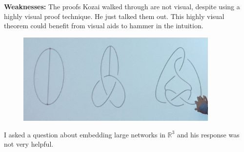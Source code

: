 \documentclass[12pt]{article}
\begin{document}
		\textbf{Weaknesses:} The proofs Kozai walked through are not visual, despite using a highly visual proof technique. He just talked them out. This highly visual theorem could benefit from visual aids to hammer in the intuition.
\begin{figure}
	\centering
		\includegraphics[width=10cm]{knots.JPG}
\end{figure}		
I asked a question about embedding large networks in $\mathbb{R}^3$ and his response was not very helpful.
	
		
	
\end{document}
